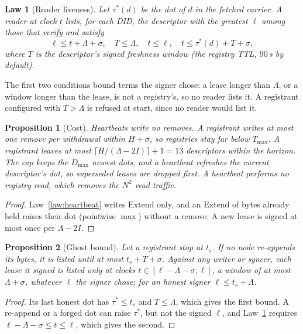 \documentclass[journal]{IEEEtran}
\newtheorem{law}{Law}
\newtheorem{proposition}{Proposition}
\newcommand{\Tmax}{T_{\max}}
\newcommand{\Dmax}{D_{\max}}
\begin{document}
\begin{law}[Reader liveness]\label{law:reader}
Let $\tau^*(d)$ be the dot of $d$ in the fetched carrier.  A reader at clock $t$ lists, for
each DID, the descriptor with the greatest $\ell$ among those that verify and satisfy
\[
\ell\le t+\Lambda+\sigma,\quad T\le\Lambda,\quad t\le\ell,\quad t\le\tau^*(d)+T+\sigma,
\]
where $T$ is the descriptor's signed freshness window (the registry TTL, $90$\,s by default).
\end{law}

The first two conditions bound terms the signer chose: a lease longer than $\Lambda$, or a
window longer than the lease, is not a registry's, so no reader lists it.  A registrant
configured with $T>\Lambda$ is refused at start, since no reader would list it.

\begin{proposition}[Cost]\label{prop:hbcost}
Heartbeats write no removes.  A registrant writes at most one remove per withdrawal within
$H+\sigma$, so registries stay far below $\Tmax$.  A registrant leaves at most
$\lceil H/(\Lambda-2I)\rceil+1=13$ descriptors within the horizon.  The cap keeps the $\Dmax$
newest dots, and a heartbeat refreshes the current descriptor's dot, so superseded leases
are dropped first.  A heartbeat performs no registry read, which removes the $N^2$ read
traffic.
\end{proposition}
\begin{proof}
Law~\ref{law:heartbeat} writes $\mathrm{Extend}$ only, and an $\mathrm{Extend}$ of bytes
already held raises their dot (pointwise $\max$) without a remove.  A new lease is signed at
most once per $\Lambda-2I$.
\end{proof}

\begin{proposition}[Ghost bound]\label{prop:ghost}
Let a registrant stop at $t_s$.  If no node re-appends its bytes, it is listed until at most
$t_s+T+\sigma$.  Against any writer or syncer, each lease it signed is listed only at clocks
$t\in[\ell-\Lambda-\sigma,\ell]$, a window of at most $\Lambda+\sigma$, whatever $\ell$ the
signer chose; for an honest signer $\ell\le t_s+\Lambda$.
\end{proposition}
\begin{proof}
Its last honest dot has $\tau^*\le t_s$ and $T\le\Lambda$, which gives the first bound.  A
re-append or a forged dot can raise $\tau^*$, but not the signed $\ell$, and Law~\ref{law:reader}
requires $\ell-\Lambda-\sigma\le t\le\ell$, which gives the second.
\end{proof}
\end{document}
